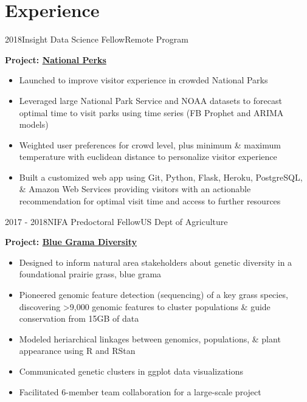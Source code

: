 \documentclass[letterpaper]{twentysecondcv} %
\begin{document}
\section{Experience}
\begin{twenty}

        	\twentyitem
    	{2018}{}{Insight Data Science Fellow}{Remote Program}
        	{}
        { \vspace{-2mm}
        \textbf{Project: \textcolor{special}{\href{http://www.nationalperks.fun}{National Perks}}}
        \vspace{1mm} 
        {\begin{itemize}
        \item Launched to improve visitor experience in crowded National Parks
        \vspace{1mm} 
        \item Leveraged large National Park Service and NOAA datasets to forecast optimal time to visit parks using time series (FB Prophet and ARIMA models)
       \vspace{1mm} 
        \item Weighted user preferences for crowd level, plus minimum \& maximum temperature with euclidean distance to personalize visitor experience
        \vspace{1mm} 
        \item Built a customized web app using Git, Python, Flask, Heroku, PostgreSQL, \& Amazon Web Services providing visitors with an actionable recommendation for optimal visit time and access to further resources 
    \end{itemize}}  \vspace{6mm} } 
    
       \twentyitem
    	{2017 - }{2018}{NIFA Predoctoral Fellow}{US Dept of Agriculture}
        	{}
	{ \vspace{-2mm}
        \textbf{Project: \textcolor{special}{\href{https://github.com/avahoffman/blue-grama-diversity}{Blue Grama Diversity}}}
        \vspace{1mm} 
        {\begin{itemize}
        \item Designed to inform natural area stakeholders about genetic diversity in a foundational prairie grass, blue grama
        \vspace{1mm} 
        \item Pioneered genomic feature detection (sequencing) of a key grass species, discovering >9,000 genomic features to cluster populations \& guide conservation from 15GB of data
        \vspace{1mm} 
        \item Modeled heriarchical linkages between genomics, populations, \& plant appearance using R and RStan
        \vspace{1mm} 
        \item Communicated genetic clusters in ggplot data visualizations 
        \item Facilitated 6-member team collaboration for a large-scale project 
    \end{itemize}}  \vspace{6mm}  } 


\end{twenty}
\end{document}
